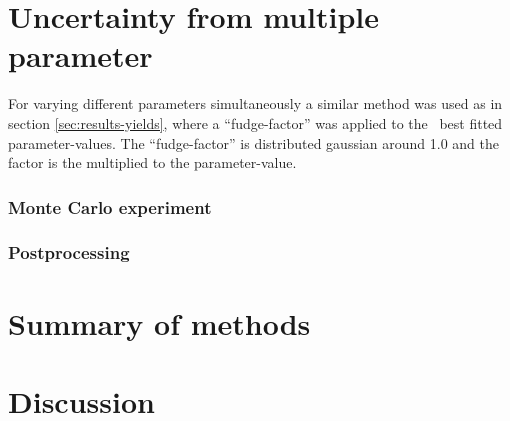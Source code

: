 \section{Uncertainty from multiple parameter}
For varying different parameters simultaneously a similar method was used as in section \ref{sec:results-yields}, where a ``fudge-factor'' was applied to the \eris\ best fitted parameter-values. The ``fudge-factor'' is distributed gaussian around 1.0 and the factor is the multiplied to the parameter-value.


\subsubsection{Monte Carlo experiment}

\subsubsection{Postprocessing}

\FloatBarrier

\section{Summary of methods}
\section{Discussion}


